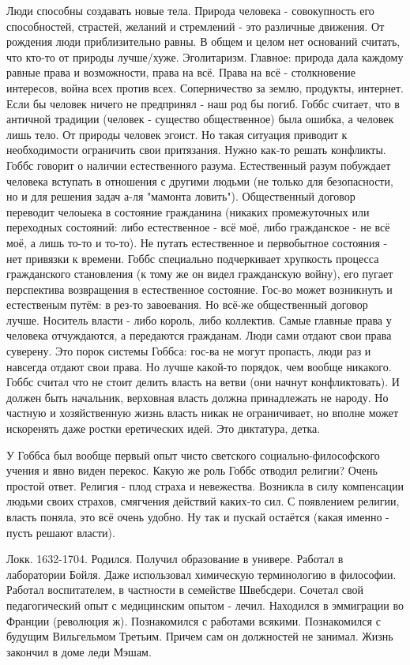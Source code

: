 Люди способны создавать новые тела. Природа человека - совокупность его способностей, страстей, желаний и стремлений - это различные движения. От рождения люди приблизительно равны. В общем и целом нет оснований считать, что кто-то от природы лучше/хуже. Эголитаризм. Главное: природа дала каждому равные права и возможности, права на всё. Права на всё - столкновение интересов, война всех против всех. Соперничество за землю, продукты, интернет. Если бы человек ничего не предпринял - наш род бы погиб. Гоббс считает, что в античной традиции (человек - существо общественное) была ошибка, а человек лишь тело. От природы человек эгоист. Но такая ситуация приводит к необходимости ограничить свои притязания. Нужно как-то решать конфликты. Гоббс говорит о наличии естественного разума. Естественный разум побуждает человека вступать в отношения с другими людьми (не только для безопасности, но и для решения задач а-ля "мамонта ловить"). Общественный договор переводит челоыека в состояние гражданина (никаких промежуточных или переходных состояний: либо естественное - всё моё, либо гражданское - не всё моё, а лишь то-то и то-то). Не путать естественное и первобытное состояния - нет привязки к времени. Гоббс специально подчеркивает хрупкость процесса гражданского становления (к тому же он видел гражданскую войну), его пугает перспектива возвращения в естественное состояние. Гос-во может возникнуть и естественым путём: в рез-то завоевания. Но всё-же общественный договор лучше. Носитель власти - либо король, либо коллектив. Самые главные права у человека отчуждаются, а передаются гражданам. Люди сами отдают свои права суверену. Это порок системы Гоббса: гос-ва не могут пропасть, люди раз и навсегда отдают свои права. Но лучше какой-то порядок, чем вообще никакого. Гоббс считал что не стоит делить власть на ветви (они начнут конфликтовать). И должен быть начальник, верховная власть должна принадлежать не народу. Но частную и хозяйственную жизнь власть никак не ограничивает, но вполне может искоренять даже ростки еретических идей. Это диктатура, детка.

У Гоббса был вообще первый опыт чисто светского социально-философского учения и явно виден перекос. Какую же роль Гоббс отводил религии? Очень простой ответ. Религия - плод страха и невежества. Возникла в силу компенсации людьми своих страхов, смягчения действий каких-то сил. С появлением религии, власть поняла, это всё очень удобно. Ну так и пускай остаётся (какая именно - пусть решают власти).

Локк. 1632-1704.
Родился. Получил образование в универе. Работал в лаборатории Бойля. Даже использовал химическую терминологию в философии. Работал воспитателем, в частности в семействе Швебсдери.
Сочетал свой педагогический опыт с медицинским опытом - лечил. Находился в эммиграции во Франции (революция ж). Познакомился с работами всякими. Познакомился с будущим Вильгельмом Третьим. Причем сам он должностей не занимал. Жизнь закончил в доме леди Мэшам.

